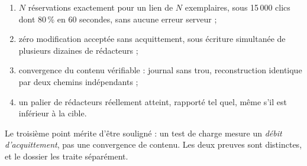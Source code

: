 \begin{enumerate}[leftmargin=1.4em,itemsep=2pt]
  \item $N$ réservations exactement pour un lien de $N$ exemplaires, sous
        15\,000 clics dont 80\,\% en 60 secondes, sans aucune erreur serveur ;
  \item zéro modification acceptée sans acquittement, sous écriture simultanée
        de plusieurs dizaines de rédacteurs ;
  \item convergence du contenu vérifiable : journal sans trou, reconstruction
        identique par deux chemins indépendants ;
  \item un palier de rédacteurs réellement atteint, rapporté tel quel, même s'il
        est inférieur à la cible.
\end{enumerate}

Le troisième point mérite d'être souligné : un test de charge mesure un
\emph{débit d'acquittement}, pas une convergence de contenu. Les deux preuves
sont distinctes, et le dossier les traite séparément.
